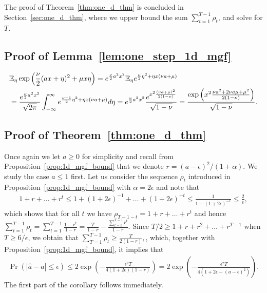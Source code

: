 The proof of Theorem~\ref{thm:one_d_thm} is concluded in Section~\ref{sec:one_d_thm}, where we upper bound the sum $\sum_{t = 1}^{T - 1}\rho_t$, and solve for $T$.



\subsection{Proof of Lemma~\ref{lem:one_step_1d_mgf}\label{sec:lem_one_step_1d}}
\begin{align*}
&\mathbb{E}_\eta \exp \left(\frac{\nu}{2} (ax + \eta)^2 + \mu x \eta\right) = e^{\frac{\nu}{2} a^2 x^2} \mathbb{E}_\eta e^{\frac{\nu}{2} \eta^2 + \eta x(\nu a + \mu)}\\
&= \frac{e^{\frac{\nu}{2} a^2 x^2} }{\sqrt{2\pi}}\int_{-\infty}^\infty e^{\frac{\nu - 1}{2} \eta^2 + \eta x(\nu a + \mu)} d\eta = e^{\frac{\nu}{2} a^2 x^2} \frac{e^{x^2\frac{(\nu a + \mu)^2}{2(1 - \nu)}}}{\sqrt{1 - \nu}} = \frac{\exp\left(x^2\frac{\nu a^2 + 2\nu a \mu + \mu^2}{2(1 - \nu)}\right)}{\sqrt{1 - \nu}}.
\end{align*}

\subsection{Proof of Theorem~\ref{thm:one_d_thm}\label{sec:one_d_thm}}
Once again we let $a \geq 0$ for simplicity and recall from Proposition~\ref{prop:1d_mgf_bound} that we denote $r = (a - \epsilon)^2/(1 + \alpha)$. We study the case $a \leq 1$ first. Let us consider the sequence $\rho_t$ introduced in Proposition~\ref{prop:1d_mgf_bound} with $\alpha = 2\epsilon$ and note that
\begin{align*}
1 + r + \ldots + r^{t} \leq 1 + (1 + 2\epsilon)^{-1} + \ldots + (1 + 2\epsilon)^{-t} \leq \frac{1}{1 - (1 + 2\epsilon)^{-1}} \leq \frac{2}{\epsilon},
\end{align*}
which shows that for all $t$ we have $\rho_{T - 1 - t} = 1 + r + \ldots + r^t$ and hence $\sum_{t = 1}^{T - 1}\rho_t = \sum_{t = 1}^{T - 1} \frac{1 - r^{t}}{1 - r} = \frac{T}{1 - r} - \frac{\sum_{t = 0}^{T - 1} r^t}{1 - r}.$
Since $T/2 \geq 1 + r + r^2 + \ldots + r^{T - 1}$ when $T \geq 6/\epsilon$, we obtain that $\sum_{T = 1}^{T - 1} \rho_t \geq \frac{T}{2(1 - r)}, $, which, together with Proposition~\ref{prop:1d_mgf_bound}, it implies that
\begin{align*}
\Pr(|\widehat a -  a| \leq \epsilon) \leq 2\exp\left(-\frac{\epsilon^2T}{4(1 + 2\epsilon)(1 - r)}\right) = 2\exp\left(-\frac{\epsilon^2T}{4(1 + 2\epsilon - (a - \epsilon)^2)}\right).
\end{align*}
The first part of the corollary follows immediately.

